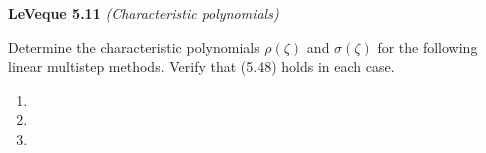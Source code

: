 \textbf{LeVeque 5.11}  \textit{(Characteristic polynomials)}

Determine the characteristic polynomials $\rho(\zeta)$ and $\sigma(\zeta)$ for the following linear multistep methods.
Verify that (5.48) holds in each case.

\begin{enumerate}
  \item 
  \pagebreak
  \item 
  \pagebreak
  \item 
\end{enumerate} 